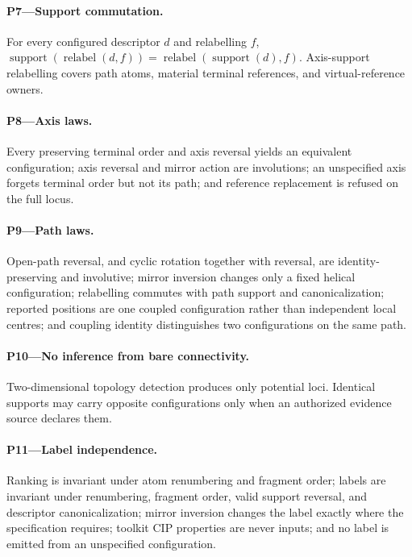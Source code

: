 \documentclass[pdflatex,sn-mathphys-num,referee,lineno]{sn-jnl}
\theoremstyle{plain}
\theoremstyle{remark}
\theoremstyle{definition}
\begin{document}
\paragraph{P7---Support commutation.}
For every configured descriptor \(d\) and relabelling \(f\),
\(\operatorname{support}(\operatorname{relabel}(d,f))
 =\operatorname{relabel}(\operatorname{support}(d),f)\).
Axis-support relabelling covers path atoms, material terminal references, and
virtual-reference owners.

\paragraph{P8---Axis laws.}
Every preserving terminal order and axis reversal yields an equivalent
configuration; axis reversal and mirror action are involutions; an unspecified
axis forgets terminal order but not its path; and reference replacement is
refused on the full locus.

\paragraph{P9---Path laws.}
Open-path reversal, and cyclic rotation together with reversal, are
identity-preserving and involutive; mirror inversion changes only a fixed
helical configuration; relabelling commutes with path support and
canonicalization; reported positions are one coupled configuration rather than
independent local centres; and coupling identity distinguishes two
configurations on the same path.

\paragraph{P10---No inference from bare connectivity.}
Two-dimensional topology detection produces only potential loci.  Identical
supports may carry opposite configurations only when an authorized evidence
source declares them.

\paragraph{P11---Label independence.}
Ranking is invariant under atom renumbering and fragment order; labels are
invariant under renumbering, fragment order, valid support reversal, and
descriptor canonicalization; mirror inversion changes the label exactly where
the specification requires; toolkit CIP properties are never inputs; and no
label is emitted from an unspecified configuration.
\end{document}
